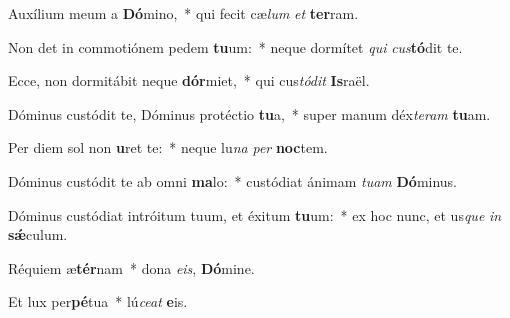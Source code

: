 \item Auxílium meum a \textbf{Dó}mino,~* qui fecit cæ\textit{lum} \textit{et} \textbf{ter}ram.

\item Non det in commotiónem pedem \textbf{tu}um:~* neque dormítet \textit{qui} \textit{cus}\textbf{tó}dit te.

\item Ecce, non dormitábit neque \textbf{dór}miet,~* qui cus\textit{tó}\textit{dit} \textbf{Is}raël.

\item Dóminus custódit te, Dóminus protéctio \textbf{tu}a,~* super manum déx\textit{te}\textit{ram} \textbf{tu}am.

\item Per diem sol non \textbf{u}ret te:~* neque lu\textit{na} \textit{per} \textbf{noc}tem.

\item Dóminus custódit te ab omni \textbf{ma}lo:~* custódiat ánimam \textit{tu}\textit{am} \textbf{Dó}minus.

\item Dóminus custódiat intróitum tuum, et éxitum \textbf{tu}um:~* ex hoc nunc, et us\textit{que} \textit{in} \textbf{sǽ}culum.

\item Réquiem æ\textbf{tér}nam~* dona \textit{e}\textit{is}, \textbf{Dó}mine.

\item Et lux per\textbf{pé}tua~* lú\textit{ce}\textit{at} \textbf{e}is.
